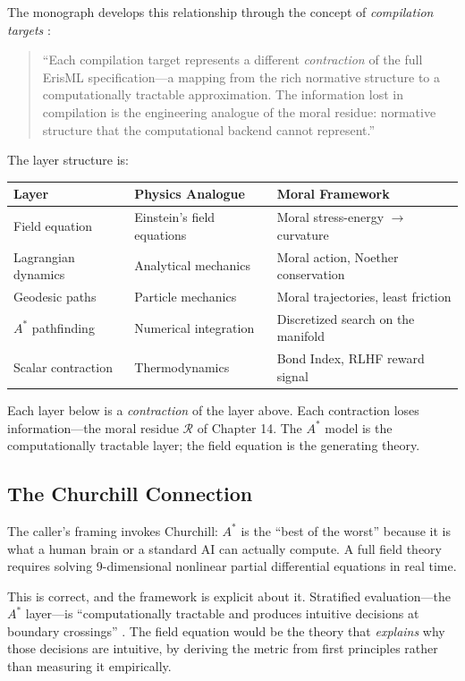 \documentclass[12pt,letterpaper]{article}
\theoremstyle{definition}
\newcommand{\calR}{\mathcal{R}}
\begin{document}
The monograph develops this relationship through the concept of \emph{compilation targets} \cite[\S20]{bond2026ge}:

\begin{quote}
``Each compilation target represents a different \emph{contraction} of the full ErisML specification---a mapping from the rich normative structure to a computationally tractable approximation. The information lost in compilation is the engineering analogue of the moral residue: normative structure that the computational backend cannot represent.''
\end{quote}

The layer structure is:

\begin{center}
\begin{tabular}{lll}
\toprule
\textbf{Layer} & \textbf{Physics Analogue} & \textbf{Moral Framework} \\
\midrule
Field equation & Einstein's field equations & Moral stress-energy $\to$ curvature \\
Lagrangian dynamics & Analytical mechanics & Moral action, Noether conservation \\
Geodesic paths & Particle mechanics & Moral trajectories, least friction \\
$A^*$ pathfinding & Numerical integration & Discretized search on the manifold \\
Scalar contraction & Thermodynamics & Bond Index, RLHF reward signal \\
\bottomrule
\end{tabular}
\end{center}

Each layer below is a \emph{contraction} of the layer above. Each contraction loses information---the moral residue $\calR$ of Chapter 14. The $A^*$ model is the computationally tractable layer; the field equation is the generating theory.

\subsection{The Churchill Connection}

The caller's framing invokes Churchill: $A^*$ is the ``best of the worst'' because it is what a human brain or a standard AI can actually compute. A full field theory requires solving 9-dimensional nonlinear partial differential equations in real time.

This is correct, and the framework is explicit about it. Stratified evaluation---the $A^*$ layer---is ``computationally tractable and produces intuitive decisions at boundary crossings'' \cite[\S9]{bond2026ge}. The field equation would be the theory that \emph{explains} why those decisions are intuitive, by deriving the metric from first principles rather than measuring it empirically.
\end{document}
